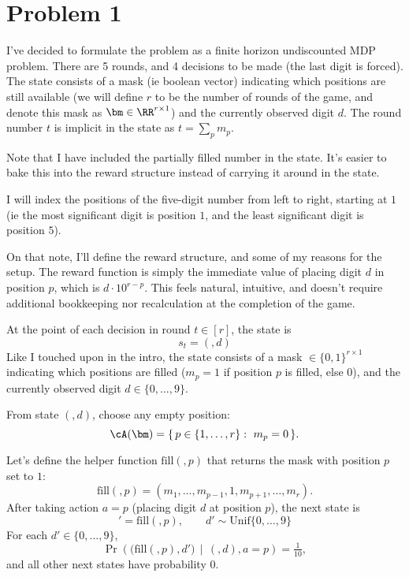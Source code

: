 \documentclass[12pt]{article}
\begin{document}
\psetheader %

\section*{Problem 1}


I've decided to formulate the problem as a finite horizon undiscounted MDP problem. There
are 5 rounds, and 4 decisions to be made (the last digit is forced). The state consists of a mask
(ie boolean vector) indicating which positions are still available (we will define
$r$ to be the number of rounds of the game, and denote this mask as $\bm \in \RR^{r \times 1}$)
and the currently observed digit $d$. The round number $t$ is implicit in the state as $t=\sum_p m_p$.

Note that I have  included the partially filled number in the state. It's easier to bake this
into the reward structure instead of carrying it around in the state.

 I will index the positions of the five-digit number from left to right, starting
at $1$ (ie the most significant digit is position $1$, and the least significant digit is position $5$).

On that note, I'll define the reward structure, and some of my reasons for the setup. The reward
function is simply the immediate value of placing digit $d$ in position $p$, which is $d\cdot 10^{r-p}$. This
feels natural, intuitive, and doesn't require additional bookkeeping nor recalculation at the completion
of the game.

\medskip
\noindent{} At the point of each decision in round $t \in [r]$, the state is
$$s_t = (\bm,d)$$
Like I touched upon in the intro, the state consists of a mask $\bm \in \{0,1\}^{r \times 1}$ indicating which positions are filled
($m_p=1$ if position $p$ is filled, else $0$), and the currently observed digit $d \in \{0,\ldots,9\}$.

\medskip
\noindent{} From state $(\bm,d)$, choose any empty position:
\[
		\cA(\bm)=\{\,p\in\{1,\ldots,r\}:\ m_p=0\,\}.
\]

\medskip
\noindent{} Let's define the helper function $\mathrm{fill}(\bm,p)$ that returns the mask with position $p$ set to $1$:
\[
		\mathrm{fill}(\bm,p) = (m_1,\ldots,m_{p-1},1,m_{p+1},\ldots,m_{r}).
\]
After taking action $a=p$ (placing digit $d$ at position $p$), the next state is
\[
		\bm'=\mathrm{fill}(\bm,p), \qquad d' \sim \mathrm{Unif}\{0,\ldots,9\}
\]
For each $d'\in\{0,\ldots,9\}$,
\[
		\Pr\!\left(\big(\mathrm{fill}(\bm,p),d'\big)\,\middle|\,(\bm,d),a=p\right)=\tfrac{1}{10},
\]
and all other next states have probability $0$.
\end{document}

